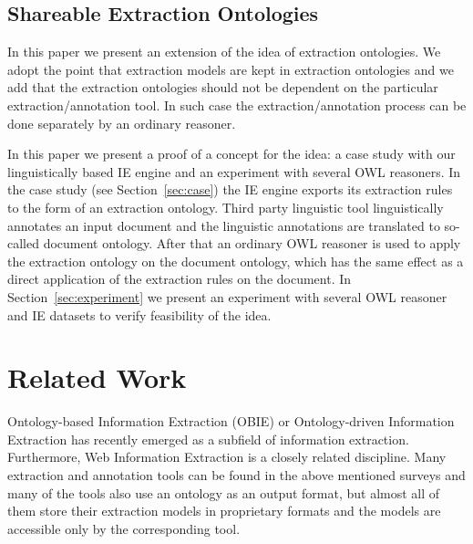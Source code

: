 \documentclass[10pt, conference, compsocconf]{IEEEtran}
\begin{document}
\subsection{Shareable Extraction Ontologies}

In this paper we present an extension of the idea of extraction ontologies. We adopt the point that extraction models are kept in extraction ontologies and we add that the extraction ontologies should not be dependent on the particular extraction/annotation tool. In such case the extraction/annotation process can be done separately by an ordinary reasoner.


In this paper we present a proof of a concept for the idea: a case study with our linguistically based IE engine and an experiment with several OWL reasoners. In the case study (see Section~\ref{sec:case}) the IE engine exports its extraction rules to the form of an extraction ontology. Third party linguistic tool linguistically annotates an input document and the linguistic annotations are translated to so-called document ontology. After that an ordinary OWL reasoner is used to apply the extraction ontology on the document ontology, which has the same effect as a direct application of the extraction rules on the document.
In Section~\ref{sec:experiment} we present an experiment with several OWL reasoner and IE datasets to verify feasibility of the idea.  




\section{Related Work}
Ontology-based Information Extraction (OBIE) \cite{citeulike:7291004} or Ontology-driven Information Extraction \cite{Yildiz:2007:OMO:1793154.1793216} has recently emerged as a subfield of information extraction. Furthermore, Web Information Extraction \cite{DBLP:journals/tkde/ChangKGS06} is a closely related discipline. Many extraction and annotation tools can be found in the above mentioned surveys \cite{citeulike:7291004,DBLP:journals/tkde/ChangKGS06} and many of the tools also use an ontology as an output format, but almost all of them store their extraction models in proprietary formats and the models are accessible only by the corresponding tool.
\end{document}
